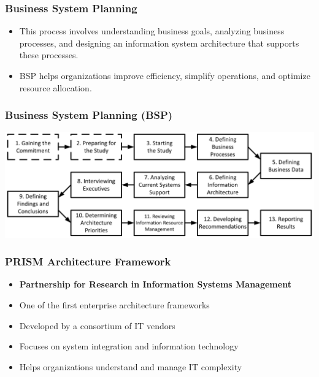 \documentclass[aspectratio=169, table]{beamer}
\begin{document}
    \begin{frame}
        \frametitle{Business System Planning}
        \begin{itemize}
            \item This process involves understanding business goals, analyzing business processes, and designing an information system architecture that supports these processes.
            \item BSP helps organizations improve efficiency, simplify operations, and optimize resource allocation.
        \end{itemize}
    \end{frame}

    {
        \begin{frame}
            \frametitle{Business System Planning (BSP)}
            \begin{center}
                \includegraphics[width=\textwidth]{../figures/bsp}
            \end{center}
        \end{frame}
    }

    \begin{frame}
        \frametitle{PRISM Architecture Framework}
        \begin{itemize}
            \item \textbf{Partnership for Research in Information Systems Management}
            \item One of the first enterprise architecture frameworks
            \item Developed by a consortium of IT vendors
            \item Focuses on system integration and information technology
            \item Helps organizations understand and manage IT complexity
        \end{itemize}
    \end{frame}
\end{document}
